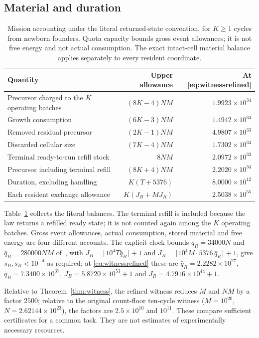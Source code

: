 \documentclass[11pt,a4paper]{article}
\theoremstyle{plain}
\theoremstyle{definition}
\theoremstyle{remark}
\begin{document}
\subsection{Material and duration}

\begin{table}[tb]
\centering\small
\caption{Mission accounting under the literal returned-state convention, for
$K\ge1$ cycles from newborn founders. Quota capacity bounds gross event
allowances; it is not free energy and not actual consumption. The exact
intact-cell material balance applies separately to every resident coordinate.}
\label{tab:accounts}
\begin{tabular}{lrr}
\toprule
Quantity & Upper allowance & At \eqref{eq:witnessrefined}\\
\midrule
Precursor charged to the $K$ operating batches & $(8K-4)NM$ & $1.9923\times10^{34}$\\
Growth consumption & $(6K-3)NM$ & $1.4942\times10^{34}$\\
Removed residual precursor & $(2K-1)NM$ & $4.9807\times10^{33}$\\
Discarded cellular size & $(7K-4)NM$ & $1.7302\times10^{34}$\\
Terminal ready-to-run refill stock & $8NM$ & $2.0972\times10^{33}$\\
Precursor including terminal refill & $(8K+4)NM$ & $2.2020\times10^{34}$\\
Duration, excluding handling & $K(T+5376)$ & $8.0000\times10^{12}$\\
Each resident exchange allowance & $K(J_B+MJ_R)$ & $2.5038\times10^{55}$\\
\bottomrule
\end{tabular}
\end{table}

Table~\ref{tab:accounts} collects the literal balances. The terminal refill is
included because the law returns a refilled ready state; it is not counted
again among the $K$ operating batches. Gross event allowances, actual
consumption, stored material and free energy are four different accounts. The
explicit clock bounds $\bar q_R=34000N$ and $\bar q_B=280000NM$
of~\citep{serial2026}, with
$J_B=\lceil10^4T\bar q_B\rceil+1$ and
$J_R=\lceil10^4M\cdot5376\,\bar q_R\rceil+1$, give
$s_B,s_R<10^{-4}$ as required; at \eqref{eq:witnessrefined} these are
$\bar q_R=2.2282\times10^{27}$, $\bar q_B=7.3400\times10^{37}$,
$J_B=5.8720\times10^{53}+1$ and $J_R=4.7916\times10^{44}+1$.

Relative to Theorem~\ref{thm:witness}, the refined witness reduces $M$ and $NM$
by a factor $2500$; relative to the original count-floor ten-cycle witness
($M=10^{20}$, $N=2.62144\times10^{23}$), the factors are $2.5\times10^{10}$ and
$10^{11}$. These compare sufficient certificates for a common task. They are not
estimates of experimentally necessary resources.
\end{document}
